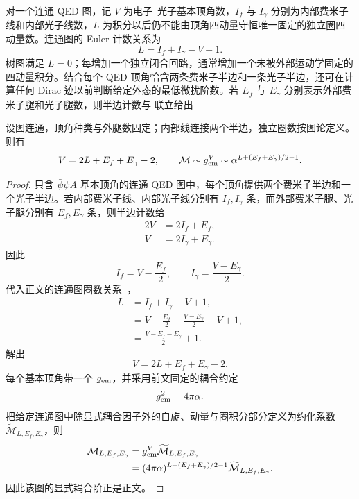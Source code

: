 对一个连通 QED 图，记 $V$ 为电子--光子基本顶角数，$I_f$ 与 $I_\gamma$ 分别为内部费米子线和内部光子线数，$L$ 为积分以后仍不能由顶角四动量守恒唯一固定的独立圈四动量数。连通图的 Euler 计数关系为
\begin{equation}
 {
 L=I_f+I_\gamma-V+1.}
 \label{eq:qed-loop-euler-dp7}
\end{equation}
树图满足 $L=0$；每增加一个独立闭合回路，通常增加一个未被外部运动学固定的四动量积分。结合每个 QED 顶角恰含两条费米子半边和一条光子半边，还可在计算任何 Dirac 迹以前判断给定外态的最低微扰阶数。若 $E_f$ 与 $E_\gamma$ 分别表示外部费米子腿和光子腿数，则半边计数与 联立给出


\begin{proposition}
设图连通，顶角种类与外腿数固定；内部线连接两个半边，独立圈数按图论定义。则有
\begin{equation}
{
V=2L+E_f+E_\gamma-2,
\qquad
\mathcal M\sim g_{\rm em}^{V}
\sim\alpha^{L+(E_f+E_\gamma)/2-1}.}
\label{eq:qed-vertex-count-order-dp76}
\end{equation}
\end{proposition}
\begin{proof}
只含 $\bar\psi\psi A$ 基本顶角的连通 QED 图中，每个顶角提供两个费米子半边和一个光子半边。若内部费米子线、内部光子线分别有 $I_f,I_\gamma$ 条，而外部费米子腿、光子腿分别有 $E_f,E_\gamma$ 条，则半边计数给
\begin{align*}
2V&=2I_f+E_f,\\
V&=2I_\gamma+E_\gamma.
\end{align*}
因此
\begin{equation*}
I_f=V-\frac{E_f}{2},
\qquad
I_\gamma=\frac{V-E_\gamma}{2}.
\end{equation*}
代入正文的连通图圈数关系~，
\begin{align*}
L
&=I_f+I_\gamma-V+1,\\
&=V-\frac{E_f}{2}+\frac{V-E_\gamma}{2}-V+1,\\
&=\frac{V-E_f-E_\gamma}{2}+1.
\end{align*}
解出
\begin{equation*}
V=2L+E_f+E_\gamma-2.
\end{equation*}
每个基本顶角带一个 $g_{\rm em}$，并采用前文固定的耦合约定
\begin{equation*}
 g_{\rm em}^2=4\pi\alpha.
\end{equation*}
把给定连通图中除显式耦合因子外的自旋、动量与圈积分部分定义为约化系数 $\widetilde{\mathcal M}_{L,E_f,E_\gamma}$，则
\begin{align*}
 \mathcal M_{L,E_f,E_\gamma}
 &=g_{\rm em}^{V}\widetilde{\mathcal M}_{L,E_f,E_\gamma}\\
 &=(4\pi\alpha)^{L+(E_f+E_\gamma)/2-1}
 \widetilde{\mathcal M}_{L,E_f,E_\gamma}.
\end{align*}
因此该图的显式耦合阶正是正文。
\end{proof}

